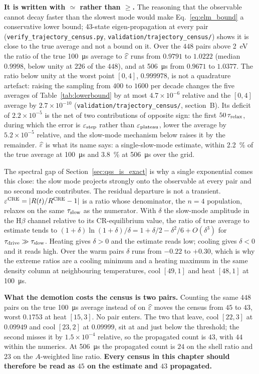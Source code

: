 \textbf{It is written with $\simeq$ rather than $\ge$.} The reasoning that
the observable cannot decay faster than the slowest mode would make
Eq.~\eqref{eq:elm_bound} a conservative lower bound;
43-state eigen-propagation at every pair (\texttt{verify\_trajectory\_census.py},
\texttt{validation/trajectory\_census/}) shows it is close to the true average
and not a bound on it. Over the $448$ pairs above \SI{2}{\electronvolt} the
ratio of the true \SI{100}{\micro\second} average to $\widehat{\varepsilon}$ runs from
$0.9791$ to $1.0222$ (median $0.9998$, below unity at $226$ of the $448$), and
at \SI{506}{\micro\second} from $0.9671$ to $1.0377$. The ratio below unity at
the worst point $[0,4]$, $0.999978$, is not a quadrature artefact: raising the
sampling from $400$ to $1600$ per decade changes the five averages of
Table~\ref{tab:lowerbound} by at most $4.7\times10^{-6}$ relative and the
$[0,4]$ average by $2.7\times10^{-10}$ (\texttt{validation/trajectory\_census/},
section~B). Its deficit of $2.2\times10^{-5}$ is the net of two contributions
of opposite sign: the first $50\,\tau_{\mathrm{relax}}$, during which the error is $\varepsilon_{\mathrm{step}}$
rather than $\varepsilon_{\mathrm{plateau}}$, lower the average by $5.2\times10^{-5}$ relative, and
the slow-mode mechanism below raises it by the remainder. $\widehat{\varepsilon}$ is what
its name says: a single-slow-mode estimate, within \SI{2.2}{\percent} of the
true average at \SI{100}{\micro\second} and \SI{3.8}{\percent} at
\SI{506}{\micro\second} over the grid.

The spectral gap of Section~\ref{sec:qss_is_exact} is why a single exponential
comes this close: the slow mode projects strongly onto the observable at every
pair and no second mode contributes. The residual departure is not a transient.
$\varepsilon^{\mathrm{CRE}} = |R(t)/R^{\mathrm{CRE}} - 1|$ is a ratio whose denominator, the $n=4$
population, relaxes on the same $\tau_{\mathrm{slow}}$ as the numerator. With $\delta$ the
slow-mode amplitude in the H$\beta$ channel relative to its CR-equilibrium
value, the ratio of true average to estimate tends to
$(1+\delta)\ln(1+\delta)/\delta = 1+\delta/2-\delta^{2}/6+O(\delta^{3})$
for $\tau_{\mathrm{drive}}\gg\tau_{\mathrm{slow}}$.
Heating gives $\delta>0$ and the estimate reads low; cooling gives $\delta<0$
and it reads high. Over the warm pairs $\delta$ runs from $-0.22$ to $+0.30$,
which is why the extreme ratios are a cooling minimum and a heating maximum in
the same density column at neighbouring temperatures, cool $[49,1]$ and heat
$[48,1]$ at \SI{100}{\micro\second}.

\textbf{What the demotion costs the census is two pairs.} Counting the same $448$ pairs on the true
\SI{100}{\micro\second} average instead of on $\widehat{\varepsilon}$ moves the census from
$45$ to $43$, worst $0.1753$ at heat $[15,3]$. No pair enters. The two that
leave, cool $[22,3]$ at $0.09949$ and cool $[23,2]$ at $0.09999$, sit at and
just below the threshold; the second misses it by $1.5\times10^{-4}$ relative,
so the propagated count is $43$, with $44$ within the numerics. At
\SI{506}{\micro\second} the propagated count is $24$ on the shell ratio and
$23$ on the $A$-weighted line ratio. \textbf{Every census in this chapter
should therefore be read as $45$ on the estimate and $43$ propagated.}

